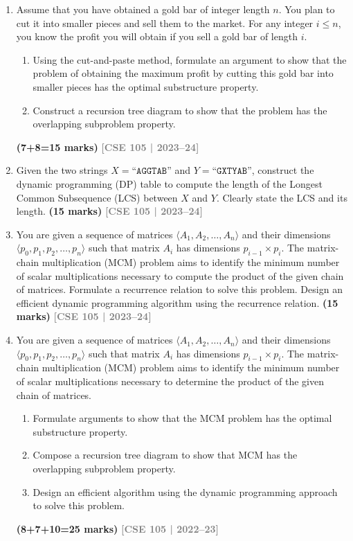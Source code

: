 \documentclass[12pt,a3paper]{article}
\newcommand{\yr}[1]{\hfill\textcolor{gray}{\small\textbf{[#1]}}}
\newcommand{\mk}[1]{\textcolor{orange!70!black}{\small\textbf{(#1 marks)}}}
\begin{document}
\begin{enumerate}
\item Assume that you have obtained a gold bar of integer length $n$. You plan to cut it into smaller pieces and sell them to the market. For any integer $i \leq n$, you know the profit you will obtain if you sell a gold bar of length $i$.
\begin{enumerate}
  \item Using the cut-and-paste method, formulate an argument to show that the problem of obtaining the maximum profit by cutting this gold bar into smaller pieces has the optimal substructure property.
  \item Construct a recursion tree diagram to show that the problem has the overlapping subproblem property.
\end{enumerate}
\mk{7+8=15}
\yr{CSE 105 | 2023--24}

\item Given the two strings $X = \texttt{``AGGTAB''}$ and $Y = \texttt{``GXTYAB''}$, construct the dynamic programming (DP) table to compute the length of the Longest Common Subsequence (LCS) between $X$ and $Y$. Clearly state the LCS and its length. \mk{15}
\yr{CSE 105 | 2023--24}

\item You are given a sequence of matrices $\langle A_1, A_2, \ldots, A_n \rangle$ and their dimensions $\langle p_0, p_1, p_2, \ldots, p_n \rangle$ such that matrix $A_i$ has dimensions $p_{i-1} \times p_i$. The matrix-chain multiplication (MCM) problem aims to identify the minimum number of scalar multiplications necessary to compute the product of the given chain of matrices. Formulate a recurrence relation to solve this problem. Design an efficient dynamic programming algorithm using the recurrence relation. \mk{15}
\yr{CSE 105 | 2023--24}

\item You are given a sequence of matrices $\langle A_1, A_2, \ldots, A_n \rangle$ and their dimensions $\langle p_0, p_1, p_2, \ldots, p_n \rangle$ such that matrix $A_i$ has dimensions $p_{i-1} \times p_i$. The matrix-chain multiplication (MCM) problem aims to identify the minimum number of scalar multiplications necessary to determine the product of the given chain of matrices.
\begin{enumerate}
  \item Formulate arguments to show that the MCM problem has the optimal substructure property.
  \item Compose a recursion tree diagram to show that MCM has the overlapping subproblem property.
  \item Design an efficient algorithm using the dynamic programming approach to solve this problem.
\end{enumerate}
\mk{8+7+10=25}
\yr{CSE 105 | 2022--23}


\end{enumerate}
\end{document}
